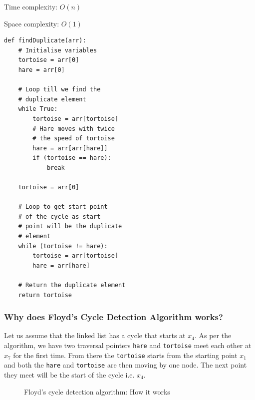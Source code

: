 \documentclass[a4paper,11pt]{book}
\begin{document}
\noindent Time complexity: $O(n)$

\noindent Space complexity: $O(1)$

\newpage
\begin{lstlisting}
def findDuplicate(arr):
    # Initialise variables
    tortoise = arr[0]
    hare = arr[0]

    # Loop till we find the
    # duplicate element
    while True:
        tortoise = arr[tortoise]
        # Hare moves with twice
        # the speed of tortoise
        hare = arr[arr[hare]]
        if (tortoise == hare):
            break

    tortoise = arr[0]

    # Loop to get start point
    # of the cycle as start
    # point will be the duplicate
    # element
    while (tortoise != hare):
        tortoise = arr[tortoise]
        hare = arr[hare]

    # Return the duplicate element
    return tortoise
\end{lstlisting}

\subsubsection{Why does Floyd's Cycle Detection Algorithm works?}

Let us assume that the linked list has a cycle that starts at $x_4$. As per the algorithm, we have two traversal pointers \lstinline{hare} and \lstinline{tortoise} meet each other at $x_7$ for the first time. From there the \lstinline{tortoise} starts from the starting point $x_1$ and both the \lstinline{hare} and \lstinline{tortoise} are then moving by one node. The next point they meet will be the start of the cycle i.e. $x_4$.
\vspace{5mm}

\begin{figure}
\begin{center}
\end{center}
\caption{Floyd's cycle detection algorithm: How it works}
\end{figure}
\end{document}
